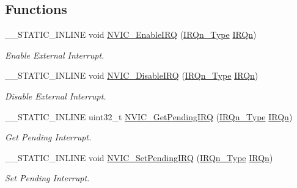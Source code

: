 \subsection*{Functions}
\begin{DoxyCompactItemize}
\item 
\+\_\+\+\_\+\+S\+T\+A\+T\+I\+C\+\_\+\+I\+N\+L\+I\+N\+E void \hyperlink{group___c_m_s_i_s___core___n_v_i_c_functions_ga3349f2e3580d7ce22d6530b7294e5921}{N\+V\+I\+C\+\_\+\+Enable\+I\+R\+Q} (\hyperlink{group___s_a_m_l21_e18_a__cmsis_gac3af4a32370fb28c4ade8bf2add80251}{I\+R\+Qn\+\_\+\+Type} \hyperlink{group___s_a_m_l21_e18_a__cmsis_ga666eb0caeb12ec0e281415592ae89083}{I\+R\+Qn})
\begin{DoxyCompactList}\small\item\em Enable External Interrupt. \end{DoxyCompactList}\item 
\+\_\+\+\_\+\+S\+T\+A\+T\+I\+C\+\_\+\+I\+N\+L\+I\+N\+E void \hyperlink{group___c_m_s_i_s___core___n_v_i_c_functions_ga260fba04ac8346855c57f091d4ee1e71}{N\+V\+I\+C\+\_\+\+Disable\+I\+R\+Q} (\hyperlink{group___s_a_m_l21_e18_a__cmsis_gac3af4a32370fb28c4ade8bf2add80251}{I\+R\+Qn\+\_\+\+Type} \hyperlink{group___s_a_m_l21_e18_a__cmsis_ga666eb0caeb12ec0e281415592ae89083}{I\+R\+Qn})
\begin{DoxyCompactList}\small\item\em Disable External Interrupt. \end{DoxyCompactList}\item 
\+\_\+\+\_\+\+S\+T\+A\+T\+I\+C\+\_\+\+I\+N\+L\+I\+N\+E uint32\+\_\+t \hyperlink{group___c_m_s_i_s___core___n_v_i_c_functions_gafec8042db64c0f8ed432b6c8386a05d8}{N\+V\+I\+C\+\_\+\+Get\+Pending\+I\+R\+Q} (\hyperlink{group___s_a_m_l21_e18_a__cmsis_gac3af4a32370fb28c4ade8bf2add80251}{I\+R\+Qn\+\_\+\+Type} \hyperlink{group___s_a_m_l21_e18_a__cmsis_ga666eb0caeb12ec0e281415592ae89083}{I\+R\+Qn})
\begin{DoxyCompactList}\small\item\em Get Pending Interrupt. \end{DoxyCompactList}\item 
\+\_\+\+\_\+\+S\+T\+A\+T\+I\+C\+\_\+\+I\+N\+L\+I\+N\+E void \hyperlink{group___c_m_s_i_s___core___n_v_i_c_functions_ga3ecf446519da33e1690deffbf5be505f}{N\+V\+I\+C\+\_\+\+Set\+Pending\+I\+R\+Q} (\hyperlink{group___s_a_m_l21_e18_a__cmsis_gac3af4a32370fb28c4ade8bf2add80251}{I\+R\+Qn\+\_\+\+Type} \hyperlink{group___s_a_m_l21_e18_a__cmsis_ga666eb0caeb12ec0e281415592ae89083}{I\+R\+Qn})
\begin{DoxyCompactList}\small\item\em Set Pending Interrupt. \end{DoxyCompactList}\item 

\end{DoxyCompactItemize}
